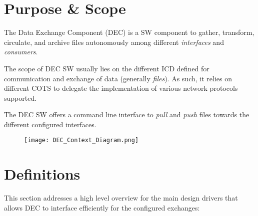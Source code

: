\documentclass[dec_sum_main.tex]{subfiles}
\begin{document}
\section{Purpose \& Scope}
The Data Exchange Component (DEC) is a SW component to gather, transform, circulate, and archive files autonomously among different \textit{interfaces} and \textit{consumers}. \newline
\par
\noindent
The scope of DEC SW usually lies on the different ICD defined for communication and exchange of data (generally \textit{files}). As such, it relies on different COTS to delegate the implementation of various network protocols supported.\newline
\par
\noindent
The DEC SW offers a command line interface to \textit{pull} and \textit{push} files towards the different configured interfaces.

\begin{figure}[hbt!]
	\centering
	\texttt{[image: DEC\_Context\_Diagram.png]}
\end{figure}

\section{Definitions}
This section addresses a high level overview for the main design drivers that allows DEC to interface efficiently for the configured exchanges:
\end{document}
